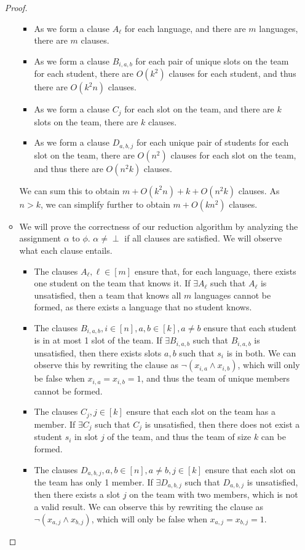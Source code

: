 \documentclass[11pt]{scrartcl}
\theoremstyle{dotlessP}
\theoremstyle{dotlessN}
\begin{document}
\begin{enumerate}[(a)]
\begin{proof}
\begin{itemize}
\begin{itemize}
	\item As we form a clause $A_\ell$ for each language, and there are $m$ languages, there are $m$ clauses.
	\item As we form a clause $B_{i,a,b}$ for each pair of unique slots on the team for each student, there are $O(k^2)$ clauses for each student, and thus there are $O(k^2n)$ clauses.
	\item As we form a clause $C_j$ for each slot on the team, and there are $k$ slots on the team, there are $k$ clauses.
\item As we form a clause $D_{a,b,j}$ for each unique pair of students for each slot on the team, there are $O(n^2)$ clauses for each slot on the team, and thus there are $O(n^2k)$ clauses.
\end{itemize}
We can sum this to obtain $m + O(k^2n) + k + O(n^2k)$ clauses. As  $n > k$, we can simplify further to obtain $m + O(kn^2)$ clauses.
\item We will prove the correctness of our reduction algorithm by analyzing the assignment $\alpha$ to $\phi$. $\alpha \neq \perp$ if all clauses are satisfied. We will observe what each clause entails.
	\begin{itemize}
		\item The clauses $A_\ell, \ell \in [m]$ ensure that, for each language, there exists one student on the team that knows it. If $\exists A_\ell$ such that $A_\ell$ is unsatisfied, then a team that knows all $m$ languages cannot be formed, as there exists a language that no student knows.
		\item The clauses $B_{i,a,b}, i \in [n], a, b \in [k], a \neq b$ ensure that each student is in at most 1 slot of the team. If $\exists B_{i,a,b}$ such that $B_{i,a,b}$ is unsatisfied, then there exists slots $a,b$ such that $s_i$ is in both. We can observe this by rewriting the clause as $\neg(x_{i,a} \land x_{i,b})$, which will only be false when  $x_{i,a} = x_{i,b} = 1$, and thus the team of unique members cannot be formed.
		\item The clauses $C_j, j \in [k]$ ensure that each slot on the team has a member. If $\exists C_j$ such that $C_j$ is unsatisfied, then there does not exist a student $s_i$ in slot $j$ of the team, and thus the team of size $k$ can be formed.
		\item The clauses $D_{a,b,j}, a,b \in [n], a \neq b, j \in [k]$ ensure that each slot on the team has only 1 member. If $\exists D_{a,b,j}$ such that $D_{a,b,j}$ is unsatisfied, then there exists a slot $j$ on the team with two members, which is not a valid result. We can observe this by rewriting the clause as $\neg(x_{a,j} \land x_{b,j})$, which will only be false when $x_{a,j} = x_{b,j} = 1$.

\end{itemize}
\end{itemize}
\end{proof}
\end{enumerate}
\end{document}
